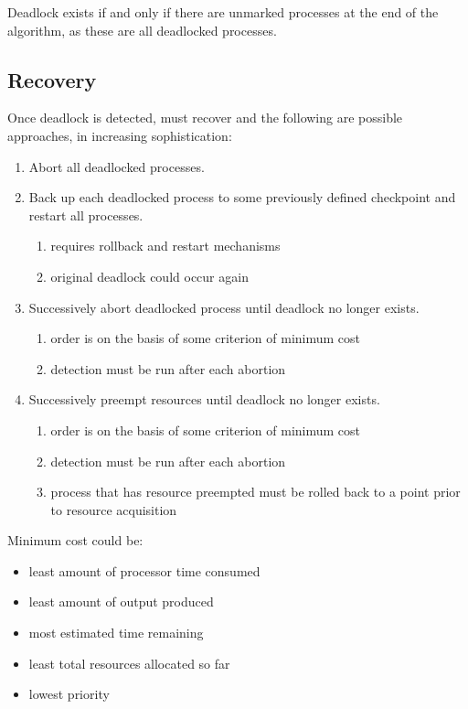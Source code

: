 \documentclass[11pt]{article}
\begin{document}
Deadlock exists if and only if there are unmarked processes at the end
of the algorithm, as these are all deadlocked processes.
\subsection{Recovery}
\label{sec:org17f976a}
Once deadlock is detected, must recover and the following are possible
approaches, in increasing sophistication:
\begin{enumerate}
\item Abort all deadlocked processes.
\item Back up each deadlocked process to some previously defined checkpoint
and restart all processes.
\begin{enumerate}
\item requires rollback and restart mechanisms
\item original deadlock could occur again
\end{enumerate}
\item Successively abort deadlocked process until deadlock no longer exists.
\begin{enumerate}
\item order is on the basis of some criterion of minimum cost
\item detection must be run after each abortion
\end{enumerate}
\item Successively preempt resources until deadlock no longer exists.
\begin{enumerate}
\item order is on the basis of some criterion of minimum cost
\item detection must be run after each abortion
\item process that has resource preempted must be rolled back to a point
prior to resource acquisition
\end{enumerate}
\end{enumerate}

Minimum cost could be:
\begin{itemize}
\item least amount of processor time consumed
\item least amount of output produced
\item most estimated time remaining
\item least total resources allocated so far
\item lowest priority
\end{itemize}
\end{document}
